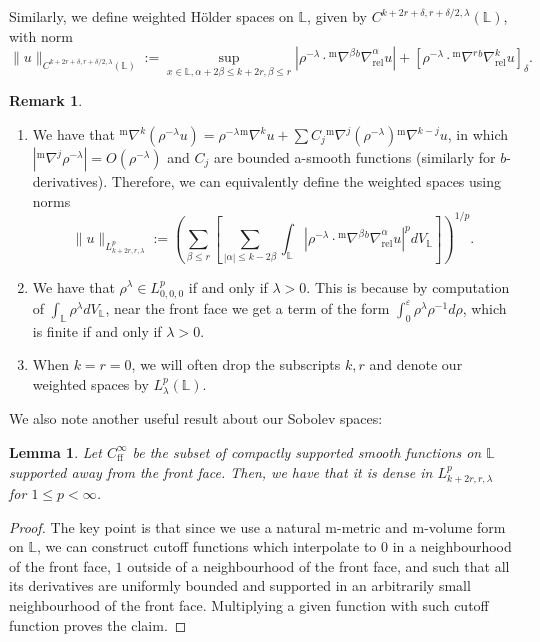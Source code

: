 \documentclass[10pt, a4paper]{article}
\theoremstyle{plain}%
\newtheorem{lem}[theorem]{Lemma}
\theoremstyle{definition}
\newtheorem{rem}[theorem]{Remark}
\numberwithin{figure}{section}
\numberwithin{equation}{section}
\newcommand{\bL}{\mathbb{L}}
\newcommand{\ff}{\mathrm{ff}}
\newcommand{\m}{\mathrm{m}}
\begin{document}
Similarly, we define weighted H\"{o}lder spaces on $\mathbb{L}$, given by $C^{k+2r+\delta,r+\delta/2,\lambda}(\mathbb{L})$, with norm\[
\|u\|_{C^{k+2r+\delta,r+\delta/2,\lambda}(\mathbb{L})} := \sup_{x\in \mathbb{L}, \alpha + 2\beta \leq k+2r, \beta \leq r}|\rho^{-\lambda}\cdot{^{\m}\nabla}^\beta{^b\nabla}_{\textrm{rel}}^\alpha u| + [\rho^{-\lambda}\cdot{^{\m}}\nabla^r{^b}\nabla_{\textrm{rel}}^k u]_\delta.
\]
\begin{rem}
	\begin{enumerate}
		\item We have that $^{\m}\nabla^k(\rho^{-\lambda}u) = \rho^{-\lambda} {^{\m}\nabla^k}u + \sum C_j {^{\m}\nabla^j}(\rho^{-\lambda}){^{\m}\nabla^{k-j}}u $, in which $|{^{\m}\nabla^j}\rho^{-\lambda}| = O(\rho^{-\lambda})$ and $C_j$ are bounded a-smooth functions (similarly for $b$-derivatives). Therefore, we can equivalently define the weighted spaces using norms \[
		\|u\|_{L^p_{k+2r,r,\lambda}}:= \left( \sum_{\beta\leq r} \left[  \sum_{|\alpha|\leq k-2\beta}\int_{\mathbb{L}} |\rho^{-\lambda}\cdot{^{\m}\nabla}^\beta{^b\nabla}_{\textrm{rel}}^\alpha u|^p dV_{\mathbb{L}} \right] \right)^{1/p}.
		\]
		\item We have that $\rho^{\lambda}\in L^p_{0,0,0}$ if and only if $\lambda > 0$. This is because by computation of $\int_{\mathbb{L}}\rho^\lambda dV_\bL$, near the front face we get a term of the form $\int_0^\varepsilon\rho^{\lambda}\rho^{-1}d\rho$, which is finite if and only if $\lambda >0$.
		\item 	When $k=r=0$, we will often drop the subscripts $k,r$ and denote our weighted spaces by $L^p_{\lambda}(\bL)$. 
	\end{enumerate}
\end{rem}




We also note another useful result about our Sobolev spaces:
\begin{lem}
	Let $C^\infty_{\ff}$ be the subset of compactly supported smooth functions on $\mathbb{L}$ supported away from the front face. Then, we have that it is dense in $L^p_{k+2r,r,\lambda}$ for $1\leq p<\infty$.
\end{lem}
\begin{proof}
	The key point is that since we use a natural m-metric and m-volume form on $\bL$, we can construct cutoff functions which interpolate to $0$ in a neighbourhood of the front face, $1$ outside of a neighbourhood of the front face, and such that all its derivatives are uniformly bounded and supported in an arbitrarily small neighbourhood of the front face. Multiplying a given function with such cutoff function proves the claim.  
\end{proof}
\end{document}
